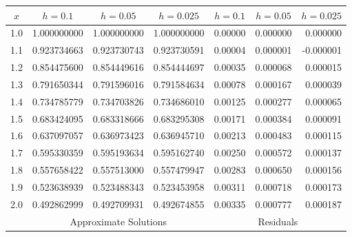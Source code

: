 \documentclass[dvips]{book}
\renewcommand{\exer}[1]{\par\medskip\;\noindent{\color{red}\bf #1.}}
\numberwithin{example}{section}
\numberwithin{equation}{section}
\numberwithin{theorem}{section}
\numberwithin{table}{section}
\numberwithin{figure}{section}
\begin{document}
\exer{3.2.10}
{\small
\begin{tabular}{|c|r|r|r|r|r|r|}\hline
\multicolumn{1}{|c|}{$x$}&
\multicolumn{1}{|c|}{$h=0.1$}&
\multicolumn{1}{|c|}{$h=0.05$}&
\multicolumn{1}{|c|}{$h=0.025$}&
\multicolumn{1}{|c|}{$h=0.1$}&
\multicolumn{1}{|c|}{$h=0.05$}&
\multicolumn{1}{|c|}{$h=0.025$}\\ \hline
1.0 & 1.000000000 & 1.000000000 & 1.000000000 &0.00000 & 0.000000 &  0.000000  \\
1.1 & 0.923734663 & 0.923730743 & 0.923730591 &0.00004 & 0.000001 & -0.000001  \\
1.2 & 0.854475600 & 0.854449616 & 0.854444697 &0.00035 & 0.000068 &  0.000015  \\
1.3 & 0.791650344 & 0.791596016 & 0.791584634 &0.00078 & 0.000167 &  0.000039  \\
1.4 & 0.734785779 & 0.734703826 & 0.734686010 &0.00125 & 0.000277 &  0.000065  \\
1.5 & 0.683424095 & 0.683318666 & 0.683295308 &0.00171 & 0.000384 &  0.000091  \\
1.6 & 0.637097057 & 0.636973423 & 0.636945710 &0.00213 & 0.000483 &  0.000115  \\
1.7 & 0.595330359 & 0.595193634 & 0.595162740 &0.00250 & 0.000572 &  0.000137  \\
1.8 & 0.557658422 & 0.557513000 & 0.557479947 &0.00283 & 0.000650 &  0.000156  \\
1.9 & 0.523638939 & 0.523488343 & 0.523453958 &0.00311 & 0.000718 &  0.000173  \\
2.0 & 0.492862999 & 0.492709931 & 0.492674855 &0.00335 & 0.000777 &  0.000187  \\
\hline
&\multicolumn{3}{c|}{Approximate Solutions}&
\multicolumn{3}{c|}{Residuals}\\\hline
\end{tabular}}
\end{document}

